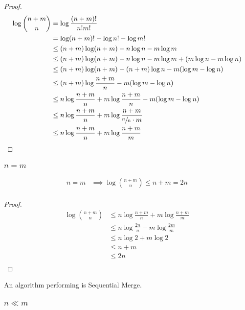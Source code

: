 \begin{proof}
\begin{align*}
\log\binom{n+m}{n} &= \log\frac{(n+m)!}{n!m!}\\
&= \log(n+m)! - \log n! - \log m!\\
&\leq (n+m) \log(n+m) - n \log n - m \log m\\
&\leq (n+m) \log(n+m) - n \log n - m \log m + (m \log n - m \log n)\\
&\leq (n+m) \log(n+m) - (n + m) \log n - m (\log m - \log n)\\
&\leq (n+m) \log\frac{n+m}{n} - m (\log m - \log n)\\
&\leq n \log\frac{n+m}{n} + m \log\frac{n+m}{n} - m (\log m - \log n)\\
&\leq n \log\frac{n+m}{n} + m \log\frac{n+m}{\sfrac{n}{n} \cdot m}\\
&\leq n \log\frac{n+m}{n} + m \log\frac{n+m}{m}\\
\end{align*}
\end{proof}

\subsubsection{$n = m$}

\begin{lemma}
\begin{align*}
n = m &\implies \log\binom{n+m}{n} \leq n + m = 2n\\
\end{align*}
\end{lemma}

\begin{proof}
\begin{align*}
\log\binom{n+m}{n} &\leq n \log\frac{n+m}{n} + m \log\frac{n+m}{m}\\
&\leq n \log\frac{2n}{n} + m \log\frac{2m}{m}\\
&\leq n \log 2 + m \log 2\\
&\leq n + m\\
&\leq 2n\\
\end{align*}
\end{proof}

An algorithm performing  is Sequential Merge.

\subsubsection{$n \ll m$}

